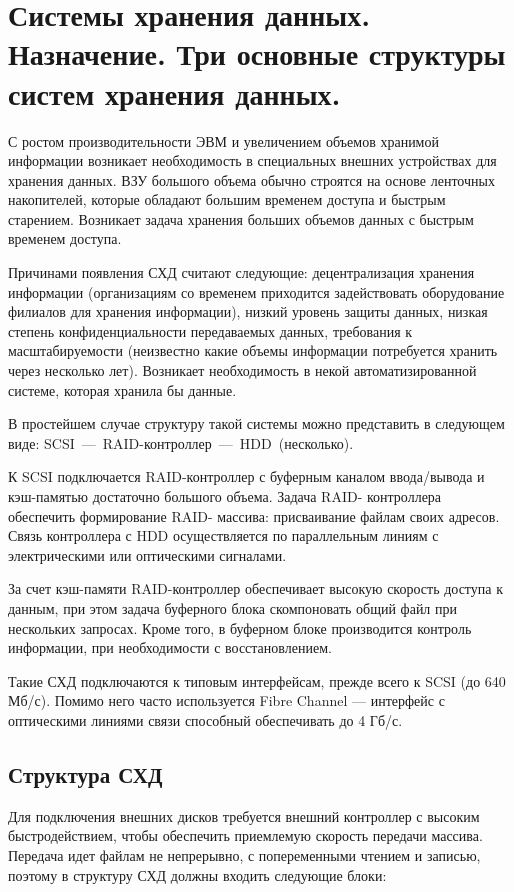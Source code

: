 \documentclass[unicode, 12pt, a4paper, oneside]{article}
\begin{document}
\section{Системы хранения данных. Назначение. Три основные структуры систем хранения данных.}

С ростом производительности ЭВМ и увеличением объемов хранимой информации возникает необходимость в специальных внешних устройствах для хранения данных. ВЗУ большого объема обычно строятся на основе ленточных накопителей, которые обладают большим временем доступа и быстрым старением. Возникает задача хранения больших объемов данных с быстрым временем доступа.

Причинами появления СХД считают следующие: децентрализация хранения информации (организациям со временем приходится задействовать оборудование филиалов для хранения информации), низкий уровень защиты данных, низкая степень конфиденциальности передаваемых данных, требования к масштабируемости (неизвестно какие объемы информации потребуется хранить через несколько лет). Возникает необходимость в некой автоматизированной системе, которая хранила бы данные.

В простейшем случае структуру такой системы можно представить в следующем виде: \mbox{SCSI --- RAID-контроллер --- HDD (несколько)}.

К SCSI подключается RAID-контроллер с буферным каналом ввода/вывода и кэш-памятью достаточно большого объема. Задача RAID- контроллера обеспечить формирование RAID- массива: присваивание файлам своих адресов. Связь контроллера с HDD осуществляется по параллельным линиям с электрическими или оптическими сигналами.

За счет кэш-памяти RAID-контроллер обеспечивает высокую скорость доступа к данным, при этом задача буферного блока скомпоновать общий файл при нескольких запросах. Кроме того, в буферном блоке производится контроль информации, при необходимости с восстановлением.

Такие СХД подключаются к типовым интерфейсам, прежде всего к SCSI (до 640 Мб/с). Помимо него часто используется Fibre Channel --- интерфейс с оптическими линиями связи способный обеспечивать до 4 Гб/с.

\subsection*{Структура СХД}

Для подключения внешних дисков требуется внешний контроллер с высоким быстродействием, чтобы обеспечить приемлемую скорость передачи массива. Передача идет файлам не непрерывно, с попеременными чтением и записью, поэтому в структуру СХД должны входить следующие блоки:
\end{document}
